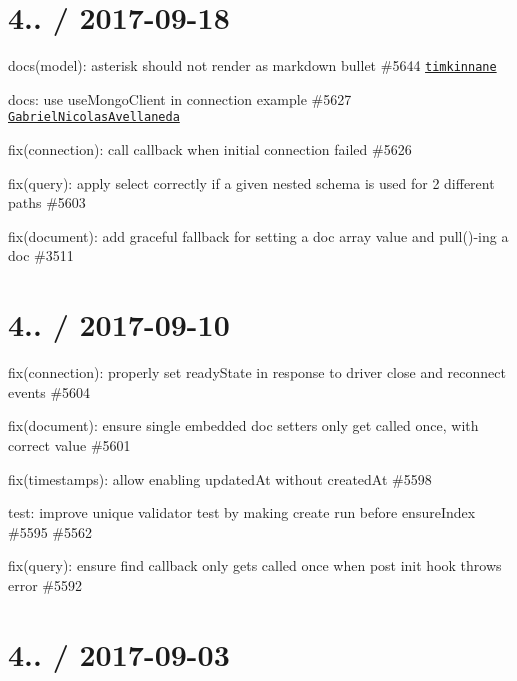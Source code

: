 \section*{4.. / 2017-\/09-\/18 }


\begin{DoxyItemize}
\item docs(model)\+: asterisk should not render as markdown bullet \#5644 \href{https://github.com/timkinnane}{\tt timkinnane}
\item docs\+: use use\+Mongo\+Client in connection example \#5627 \href{https://github.com/GabrielNicolasAvellaneda}{\tt Gabriel\+Nicolas\+Avellaneda}
\item fix(connection)\+: call callback when initial connection failed \#5626
\item fix(query)\+: apply select correctly if a given nested schema is used for 2 different paths \#5603
\item fix(document)\+: add graceful fallback for setting a doc array value and {\ttfamily pull()}-\/ing a doc \#3511
\end{DoxyItemize}

\section*{4.. / 2017-\/09-\/10 }


\begin{DoxyItemize}
\item fix(connection)\+: properly set ready\+State in response to driver \textquotesingle{}close\textquotesingle{} and \textquotesingle{}reconnect\textquotesingle{} events \#5604
\item fix(document)\+: ensure single embedded doc setters only get called once, with correct value \#5601
\item fix(timestamps)\+: allow enabling updated\+At without created\+At \#5598
\item test\+: improve unique validator test by making create run before ensure\+Index \#5595 \#5562
\item fix(query)\+: ensure find callback only gets called once when post init hook throws error \#5592
\end{DoxyItemize}

\section*{4.. / 2017-\/09-\/03 }


